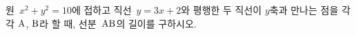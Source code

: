 원~$x^2+y^2=10$에 접하고 직선~$y=3x+2$와 평행한 두 직선이 $y$축과 만나는 점을 각각 $\mathrm{A}$, $\mathrm{B}$라 할 때, 선분~$\mathrm{AB}$의 길이를 구하시오.
